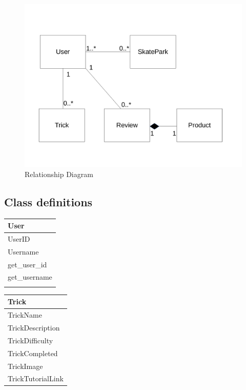 {{{\begin{figure}[H]
    \includegraphics[width=\textwidth]{./Analysis/RelationshipDiagram.pdf}
    \caption{Relationship Diagram} \label{fig:Relationship Diagram}
\end{figure}

\subsection{Class definitions}

\begin{center}
\begin{tabular}{|p{5cm}|}
    \hline
 \textbf{User} \\ \hline
UserID\\
Username \\ \hline
get\_user\_id \\
get\_username \\
\\ \hline 
\end{tabular}
\label{tab:User Class Definition}
\end{center}

\begin{center}
\begin{tabular}{|p{5cm}|}
    \hline
 \textbf{Trick} \\ \hline
TrickName\\
TrickDescription \\
TrickDifficulty \\
TrickCompleted \\
TrickImage \\
TrickTutorialLink \\ \hline


\end{tabular}
\end{center}}}}
